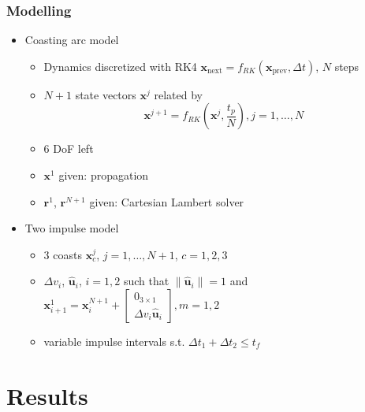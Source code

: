 \documentclass{beamer}
\begin{document}
\begin{frame}
    \frametitle{Modelling}

    \begin{itemize}
        \item Coasting arc model
        \begin{itemize}
            \item Dynamics discretized with RK4 \(\mathbf{x}_{\text{next}} = f_{RK}(\mathbf{x}_{\text{prev}}, \Delta t)\), \(N\) steps
            \item \(N+1\) state vectors \(\mathbf{x}^j\) related by
            \begin{equation}
                 \mathbf{x}^{j+1} = f_{RK}(\mathbf{x}^j, \frac{t_p}{N}), j = 1, \dots, N
            \end{equation}
            \item 6 DoF left
            \item \(\mathbf{x}^1\) given: propagation
            \item \(\mathbf{r}^1\), \(\mathbf{r}^{N+1}\) given: Cartesian Lambert solver
        \end{itemize}
        \item Two impulse model
        \begin{itemize}
            \item 3 coasts \(\mathbf{x}^j_c\), \(j=1,\dots,N+1\), \(c=1,2,3\)
            \item \(\Delta v_i\), \(\hat{\mathbf{u}}_i\), \(i = 1, 2\) such that \(\lVert \hat{\mathbf{u}}_i \rVert = 1\) and \(\mathbf{x}_{i+1}^1 = \mathbf{x}_i^{N+1} + \begin{bmatrix}
                0_{3\times1} \\ \Delta v_i \hat{\mathbf{u}}_i
            \end{bmatrix}, m=1, 2\)
            \item variable impulse intervals s.t. \(\Delta t_1 + \Delta t_2 \leq t_f\)
        \end{itemize}
    \end{itemize}
\end{frame}

\section{Results}
\end{document}
